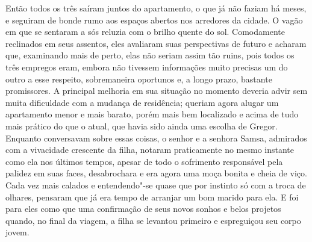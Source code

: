 Então todos os três saíram juntos do apartamento, o que já não faziam há
meses, e seguiram de bonde rumo aos espaços abertos nos arredores da
cidade. O vagão em que se sentaram a sós reluzia com o brilho quente do
sol. Comodamente reclinados em seus assentos, eles avaliaram suas
perspectivas de futuro e acharam que, examinando mais de perto, elas não
seriam assim tão ruins, pois todos os três empregos eram, embora não
tivessem informações muito precisas um do outro a esse respeito,
sobremaneira oportunos e, a longo prazo, bastante promissores. A principal
melhoria em sua situação no momento deveria advir sem muita dificuldade
com a mudança de residência; queriam agora alugar um apartamento menor e
mais barato, porém mais bem localizado e acima de tudo mais prático do que
o atual, que havia sido ainda uma escolha de Gregor. Enquanto conversavam
sobre essas coisas, o senhor e a senhora Samsa, admirados com a vivacidade
crescente da filha, notaram praticamente no mesmo instante como ela nos
últimos tempos, apesar de todo o sofrimento responsável pela palidez em
suas faces, desabrochara e era agora uma moça bonita e cheia de viço. Cada
vez mais calados e entendendo"-se quase que por instinto só com a troca de
olhares, pensaram que já era tempo de arranjar um bom marido para ela. E
foi para eles como que uma confirmação de seus novos sonhos e belos
projetos quando, no final da viagem, a filha se levantou primeiro e
espreguiçou seu corpo jovem.

\movetooddpage
{}
\theendnotes
